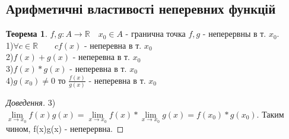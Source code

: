 \documentclass[14pt,a4paper]{scrartcl}
\theoremstyle{definition}
\newtheorem*{teo}{Теорема}
\theoremstyle{remark}
\theoremstyle{definition}
\theoremstyle{definition}
\begin{document}
\subsection{Арифметичні властивості неперевних функцій}

\begin{teo}
  $f,g:A\to\mathbb{R} \quad x_0\in A$ - гранична точка
  \quad $f,g$ - неперервны в т. $x_0$.\\
  1)$\forall c \in \mathbb{R}\qquad cf(x)$ - неперевна в т. $x_0$\\
  2)$f(x)+g(x)$ - неперевна в т. $x_0$\\
  3)$f(x)*g(x)$ - неперевна в т. $x_0$\\
  4)$g(x_0)\neq 0$ то $\frac{f(x)}{g(x)} $ - неперевна в т. $x_0$\\
\end{teo}

\begin{proof}[Доведення]
  3) $ \lim\limits_{x\to x_0}{f(x)g(x)} =  \lim\limits_{x\to x_0}{f(x)}* \lim\limits_{x\to x_0}{g(x)} = f(x_0)*g(x_0)$. Таким чином, f(x)g(x) - неперервна.
\end{proof}
\end{document}
